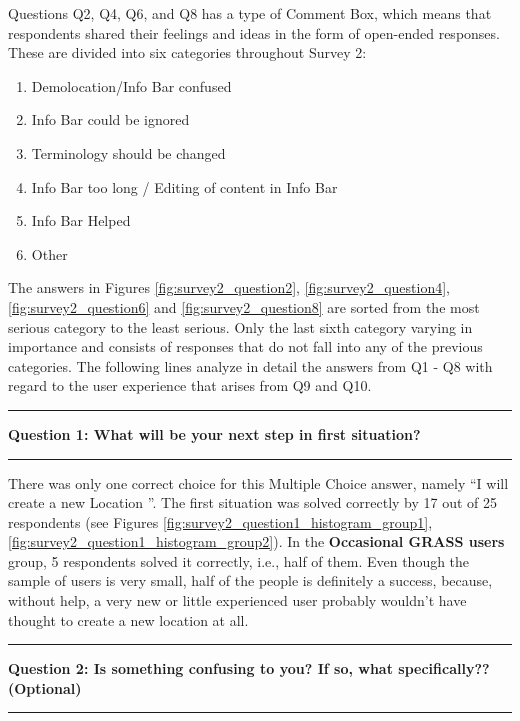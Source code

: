 \documentclass[a4paper,10pt,twoside]{article}
\begin{document}
\newpage
\noindent Questions Q2, Q4, Q6, and Q8 has a type of Comment Box,
which means that respondents shared their feelings and ideas in the
form of open-ended responses. These are divided into six categories
throughout Survey 2:

\begin{enumerate}
\item Demolocation/Info Bar confused
\item Info Bar could be ignored
\item Terminology should be changed
\item Info Bar too long / Editing of content in Info Bar
\item Info Bar Helped
\item Other
\end{enumerate}

\noindent The answers in Figures \ref{fig:survey2_question2},
\ref{fig:survey2_question4}, \ref{fig:survey2_question6} and
\ref{fig:survey2_question8} are sorted from the most serious category
to the least serious. Only the last sixth category varying in
importance and consists of responses that do not fall into any of the
previous categories. The following lines analyze in detail the answers
from Q1 - Q8 with regard to the user experience that arises from Q9
and Q10.

\par\noindent\rule{\textwidth}{0.4pt}
\noindent \textbf{Question 1: What will be your next step in first situation?}
\par\noindent\rule{\textwidth}{0.4pt}

\noindent There was only one correct choice for this Multiple Choice
answer, namely ``I will create a new Location ''. The first situation
was solved correctly by 17 out of 25 respondents (see Figures
\ref{fig:survey2_question1_histogram_group1},
\ref{fig:survey2_question1_histogram_group2}). In the
\textbf{Occasional GRASS users} group, 5 respondents solved it
correctly, i.e., half of them. Even though the sample of users is very
small, half of the people is definitely a success, because, without
help, a very new or little experienced user probably wouldn't have
thought to create a new location at all.

\par\noindent\rule{\textwidth}{0.4pt}
\noindent \textbf{Question 2: Is something confusing to you? If so, what specifically?? (Optional)}
\par\noindent\rule{\textwidth}{0.4pt}
\end{document}
